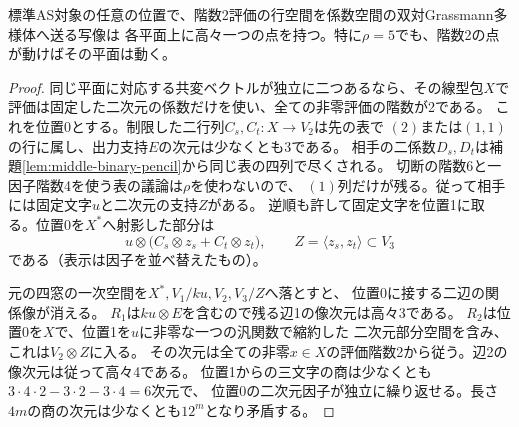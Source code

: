 \begin{proposition}\label{prop:rank-two-evaluation-fiber}
標準AS対象の任意の位置で、階数2評価の行空間を係数空間の双対Grassmann多様体へ送る写像は
各平面上に高々一つの点を持つ。特に$\rho=5$でも、階数2の点が動けばその平面は動く。
\end{proposition}
\begin{proof}
同じ平面に対応する共変ベクトルが独立に二つあるなら、その線型包$X$で
評価は固定した二次元の係数だけを使い、全ての非零評価の階数が2である。
これを位置0とする。制限した二行列$C_s,C_t:X\to V_2$は先の表で
$(2)$または$(1,1)$の行に属し、出力支持$E$の次元は少なくとも3である。
相手の二係数$D_s,D_t$は補題\ref{lem:middle-binary-pencil}から同じ表の四列で尽くされる。
切断の階数6と一因子階数4を使う表の議論は$\rho$を使わないので、
$(1)$列だけが残る。従って相手には固定文字$u$と二次元の支持$Z$がある。
逆順も許して固定文字を位置1に取る。位置0を$X^*$へ射影した部分は
\[
  u\otimes\bigl(C_s\otimes z_s+C_t\otimes z_t\bigr),
 \qquad Z=\langle z_s,z_t\rangle\subset V_3
\]
である（表示は因子を並べ替えたもの）。

元の四窓の一次空間を$X^*,V_1/ku,V_2,V_3/Z$へ落とすと、
位置0に接する二辺の関係像が消える。
$R_1$は$ku\otimes E$を含むので残る辺1の像次元は高々3である。
$R_2$は位置0を$X$で、位置1を$u$に非零な一つの汎関数で縮約した
二次元部分空間を含み、これは$V_2\otimes Z$に入る。
その次元は全ての非零$x\in X$の評価階数2から従う。辺2の像次元は従って高々4である。
位置1からの三文字の商は少なくとも$3\cdot4\cdot2-3\cdot2-3\cdot4=6$次元で、
位置0の二次元因子が独立に繰り返せる。長さ$4m$の商の次元は少なくとも$12^m$となり矛盾する。
\end{proof}
